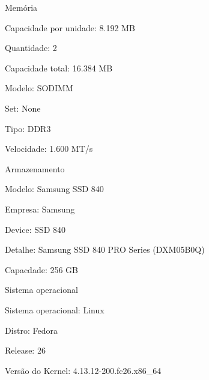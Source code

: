 \begin{anexosenv}
\begin{alineas}
        \item Memória

        \begin{alineas}

            \item Capacidade por unidade: 8.192 MB

            \item Quantidade: 2

            \item Capacidade total: 16.384 MB

            \item Modelo: SODIMM

            \item Set: None

            \item Tipo: DDR3

            \item Velocidade: 1.600 MT/s

        \end{alineas}

        \item Armazenamento

        \begin{alineas}

            \item Modelo: Samsung SSD 840

            \item Empresa: Samsung

            \item Device: SSD 840

            \item Detalhe: Samsung SSD 840 PRO Series (DXM05B0Q)

            \item Capacdade: 256 GB

        \end{alineas}

        \item Sistema operacional

        \begin{alineas}

            \item Sistema operacional: Linux

            \item Distro: Fedora

            \item Release: 26

            \item Versão do Kernel: 4.13.12-200.fc26.x86\_64

        \end{alineas}

        \end{alineas}



\end{anexosenv}
